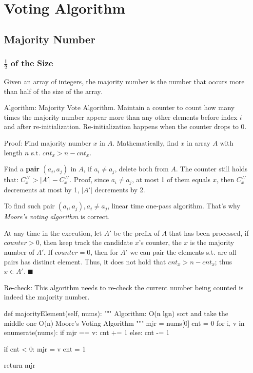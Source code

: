 \section{Voting Algorithm}
\subsection{Majority Number}
\subsubsection{$\frac{1}{2}$ of the Size}
Given an array of integers, the majority number is the number that occurs more than half of the size of the array. 

Algorithm: Majority Vote Algorithm. Maintain a counter to count how many times the majority number appear more than any other elements before index $i$ and after re-initialization. Re-initialization happens when the counter drops to 0. 

Proof: Find majority number $x$ in $A$. Mathematically, find $x$ in array $A$ with length $n$ s.t. $cnt_x > n -cnt_x$. 

Find a \textbf{pair} $(a_i, a_j)$ in $A$, if $a_i \neq a_j$, delete both from $A$. The counter  still
holds that: $C^{A'}_x > |A'|-C^{A'}_x$. Proof, since $a_i\neq a_j$, at most 1 of them
equals $x$, then $C^{A'}_x$ decrements at most by 1, $|A'|$ decrements by 2.

To find such pair $(a_i, a_j), a_i\neq a_j$, linear time one-pass algorithm. That's
why \textit{Moore's voting algorithm} is correct.

At any time in the execution, let $A'$ be the prefix of $A$ that has been processed,
if $counter>0$, then keep track the candidate $x$'s counter, the $x$
is the majority number of $A'$.  If $counter =0$, then for $A'$ we can pair the elements
s.t. are all pairs has distinct element. Thus, it does not hold that $cnt_x>n-cnt_x$;
thus $x\in A'$. $\blacksquare$
 
Re-check: This algorithm needs to re-check the current number being counted is indeed the majority number.    

\begin{python}
def majorityElement(self, nums):
    """
    Algorithm:
    O(n lgn) sort and take the middle one
    O(n) Moore's Voting Algorithm
    """
    mjr = nums[0]
    cnt = 0
    for i, v in enumerate(nums):
        if mjr == v:
            cnt += 1
        else:
            cnt -= 1

        if cnt < 0:
            mjr = v
            cnt = 1

    return mjr

\end{python}
